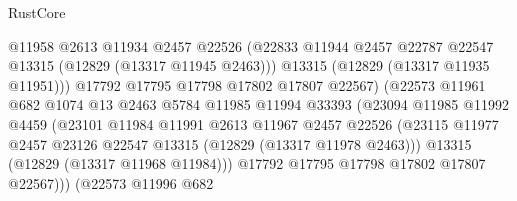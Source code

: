 \begin{lexlean}{RustCore}
\begin{coremodule}
                                    @11958
                                    @2613
                                    @11934
                                    @2457
                                    @22526
                                    (@22833
                                      @11944
                                      @2457
                                      @22787
                                      @22547
                                      @13315
                                      (@12829 (@13317 @11945 @2463)))
                                    @13315
                                    (@12829 (@13317 @11935 @11951)))
                                  @17792
                                  @17795
                                  @17798
                                  @17802
                                  @17807
                                  @22567)
                                (@22573
                                  @11961
                                  @682
                                  @1074
                                  @13
                                  @2463
                                  @5784
                                  @11985
                                  @11994
                                  @33393
                                  (@23094
                                    @11985
                                    @11992
                                    @4459
                                    (@23101
                                      @11984
                                      @11991
                                      @2613
                                      @11967
                                      @2457
                                      @22526
                                      (@23115
                                        @11977
                                        @2457
                                        @23126
                                        @22547
                                        @13315
                                        (@12829 (@13317 @11978 @2463)))
                                      @13315
                                      (@12829 (@13317 @11968 @11984)))
                                    @17792
                                    @17795
                                    @17798
                                    @17802
                                    @17807
                                    @22567)))
                              (@22573
                                @11996
                                @682

\end{coremodule}
\end{lexlean}
